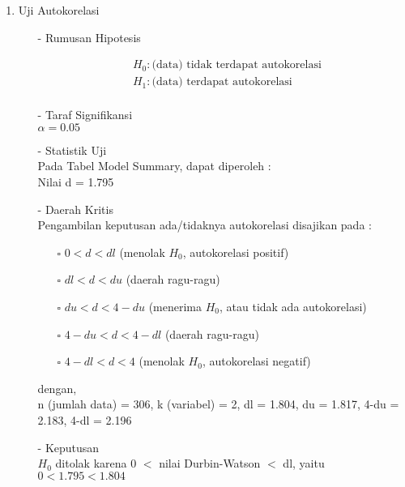 \begin{enumerate}
\begin{enumerate}
    \item Uji Autokorelasi \\
    \begin{test}{
        \begin{enumerate}
        \item[-] Rumusan Hipotesis \\
        \begin{fleqn}[\parindent]
            \begin{equation*}
            \begin{split}
            &H_0 : \text{(data) tidak terdapat autokorelasi} \\ 
            &H_1 : \text{(data) terdapat autokorelasi} \\
            \end{split}
            \end{equation*}
        \end{fleqn}
    
        \item[-] Taraf Signifikansi \\
        $\alpha = 0.05$
    
        \item[-] Statistik Uji \\
        Pada Tabel Model Summary, dapat diperoleh : \\
        Nilai d = 1.795
    
        \item[-] Daerah Kritis \\
        Pengambilan keputusan ada/tidaknya autokorelasi disajikan pada :
        \begin{enumerate}
        \item[$\square$] $0 < d < dl$ (menolak $H_0$, autokorelasi positif)
        \item[$\square$] $dl < d < du$ (daerah ragu-ragu)
        \item[$\square$] $du < d < 4-du$ (menerima $H_0$, atau tidak ada autokorelasi)
        \item[$\square$] $4-du < d < 4-dl$ (daerah ragu-ragu)
        \item[$\square$] $4-dl < d < 4$ (menolak $H_0$, autokorelasi negatif)
        \end{enumerate}
        dengan, \\
        n (jumlah data) = 306, k (variabel) = 2, dl = 1.804, du = 1.817, 4-du = 2.183, 4-dl = 2.196
    
        \item[-] Keputusan \\
        $H_0$ ditolak karena 0 $<$ nilai Durbin-Watson $<$ dl, yaitu $0 < 1.795 < 1.804$
    

\end{enumerate}}
\end{test}
\end{enumerate}
\end{enumerate}
